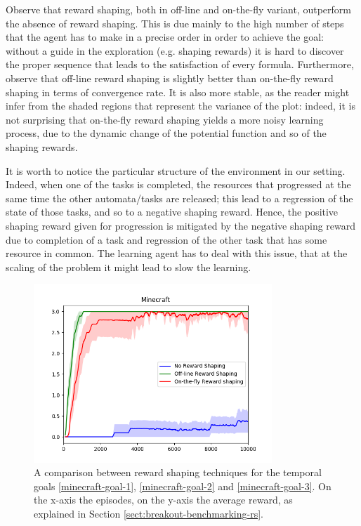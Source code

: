 Observe that reward shaping, both in off-line and on-the-fly variant, outperform the absence of reward shaping. This is due mainly to the high number of steps that the agent has to make in a precise order in order to achieve the goal: without a guide in the exploration (e.g. shaping rewards) it is hard to discover the proper sequence that leads to the satisfaction of every formula. Furthermore, observe that off-line reward shaping is slightly better than on-the-fly reward shaping in terms of convergence rate. It is also more stable, as the reader might infer from the shaded regions that represent the variance of the plot: indeed, it is not surprising that on-the-fly reward shaping yields a more noisy learning process, due to the dynamic change of the potential function and so of the shaping rewards.

It is worth to notice the particular structure of the environment in our setting. Indeed, when one of the tasks is completed, the resources that progressed at the same time the other automata/tasks are released; this lead to a regression of the state of those tasks, and so to a negative shaping reward. Hence, the positive shaping reward given for progression is mitigated by the negative shaping reward due to completion of a task and regression of the other task that has some resource in common. The learning agent has to deal with this issue, that at the scaling of the problem it might lead to slow the learning.


\begin{figure}
	\centering
	\includegraphics[width=0.8\textwidth]{images/minecraft-comparison.png}
	\caption{A comparison between reward shaping techniques for the temporal goals \ref{minecraft-goal-1}, \ref{minecraft-goal-2} and \ref{minecraft-goal-3}. On the x-axis the episodes, on the y-axis the average reward, as explained in Section \ref{sect:breakout-benchmarking-rs}.}
	\label{fig:minecraft-comparison}
\end{figure}


